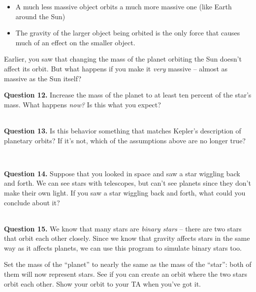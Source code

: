 \documentclass[11pt]{article}
\begin{document}
\begin{itemize}
	\item A much less massive object orbits a much more massive one (like Earth around the Sun)
	\item The gravity of the larger object being orbited is the only force that causes much of an effect on the smaller object. 
\end{itemize}

Earlier, you saw that changing the mass of the planet orbiting the Sun doesn't affect its orbit. But what happens if you make it {\it very} massive -- almost as massive as the Sun itself? 

\textbf{Question 12.} Increase the mass of the planet to at least ten percent of the star's mass. What happens {\it now?} Is this what you expect?

\vspace{1.5cm}

\hrulefill\\


\textbf{Question 13.} Is this behavior something that matches Kepler's description of planetary orbits? If it's not, which of the assumptions above are no longer true?

\vspace{1.5cm}

\vfill
\hrulefill\\

\newpage

\textbf{Question 14.} Suppose that you looked in space and saw a star wiggling back and forth. We can see stars with telescopes, but can't see planets since they don't make their own light. If you saw a star wiggling back and forth, what could you conclude about it?

\vspace{2.5cm}

\hrulefill\\

\textbf{Question 15.} We know that many stars are {\it binary stars} -- there are two stars that orbit each other closely. Since we know that gravity affects stars in the same way as it affects planets, we can use this program to simulate binary stars too. 

Set the mass of the ``planet'' to nearly the same as the mass of the ``star'': both of them will now represent stars. See if you can create an orbit where the two stars orbit each other. Show your orbit to your TA when you've got it.
\end{document}
